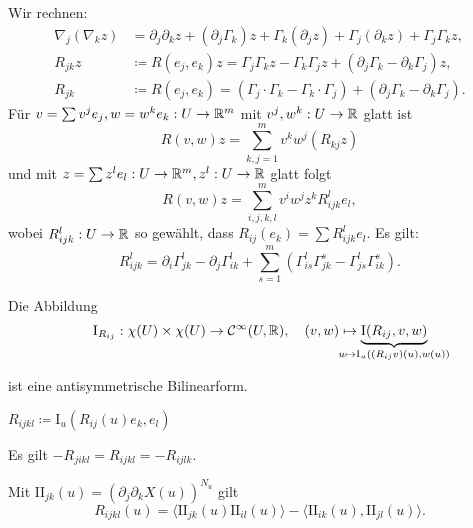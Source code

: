 \documentclass{cheat-sheet}
\newcommand{\FFI}{\mathrm{I}} %
\newcommand{\FFII}{\mathrm{I\!I}} %
\begin{document}

\begin{bem}
  Wir rechnen:
  \begin{align*}
    \nabla_j (\nabla_k z) &= \partial_j \partial_k z + (\partial_j \Gamma_k) z + \Gamma_k (\partial_j z) + \Gamma_j (\partial_k z) + \Gamma_j \Gamma_k z, \\
    R_{jk} z &\coloneqq R(e_j, e_k) z = \Gamma_j \Gamma_k z - \Gamma_k \Gamma_j z + (\partial_j \Gamma_k - \partial_k \Gamma_j) z, \\
    R_{jk} &\coloneqq R(e_j, e_k) = (\Gamma_j \cdot \Gamma_k - \Gamma_k \cdot \Gamma_j) + (\partial_j \Gamma_k - \partial_k \Gamma_j).
  \end{align*}
  Für $v = \sum v^j e_j, w = w^k e_k : U \to \R^m$ mit $v^j, w^k : U \to \mathbb{R}$ glatt ist
  \[ R(v, w) z = \sum_{k,j=1}^m v^k w^j (R_{kj} z) \]
  und mit $z = \sum z^l e_l : U \to \R^m, z^l : U \to \R$ glatt folgt
  \[ R(v, w) z = \sum_{i,j,k,l}^m v^i w^j z^k R_{ijk}^l e_l, \]
  wobei $R_{ijk}^l : U \to \mathbb{R}$ so gewählt, dass $R_{ij}(e_k) = \sum R_{ijk}^l e_l$. Es gilt:
  \[ R_{ijk}^l = \partial_i \Gamma_{jk}^l - \partial_j \Gamma_{ik}^l + \sum_{s=1}^m (\Gamma_{is}^l \Gamma_{jk}^s - \Gamma_{js}^l \Gamma_{ik}^s). \]
\end{bem}


\begin{satz}
  Die Abbildung
  \[
    \FFI_{R_{ij}} : \chi(U) \times \chi(U) \to \mathcal{C}^\infty(U, \R), \quad
    (v, w) \mapsto \underbrace{\FFI(R_{ij}, v, w)}_{\mathclap{u \mapsto \FFI_u((R_{ij} v)(u), w(u))}}
  \]

  \vspace{-12pt}

  ist eine antisymmetrische Bilinearform.
\end{satz}

\begin{nota}
  $R_{ijkl} \coloneqq \FFI_u(R_{ij}(u) e_k, e_l)$
\end{nota}

\begin{lem}
  Es gilt $- R_{jikl} = R_{ijkl} = - R_{ijlk}$.
\end{lem}

\begin{satz}[Gaußgleichung]
  Mit $\FFII_{jk}(u) = \left( \partial_j \partial_k X(u) \right)^{N_u}$ gilt
  \[ R_{ijkl}(u) = \langle \FFII_{jk} (u) \FFII_{il}(u) \rangle - \langle \FFII_{ik}(u), \FFII_{jl}(u) \rangle. \]
\end{satz}
\end{document}
